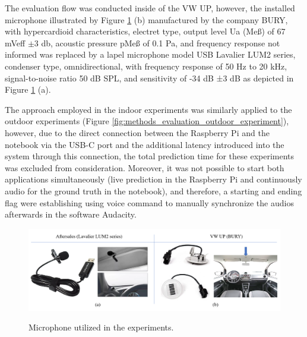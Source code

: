 The evaluation flow was conducted inside of the VW UP, however, the installed microphone illustrated by Figure \ref{fig:methods_evaluation_microphone_aftersales_and_VW_UP} (b) manufactured by the company BURY, with hypercardioid characteristics, electret type, output level Ua (Meß) of 67 mVeff $\pm$3 \gls{db}, acoustic pressure pMeß of 0.1 Pa, and frequency response not informed \cite{BURY2024} was replaced by a lapel microphone model USB Lavalier LUM2 series, condenser type, omnidirectional, with frequency response of 50 Hz to 20 kHz, signal-to-noise ratio 50 dB SPL, and sensitivity of -34 dB ±3 dB \cite{CKMOVA2021} as depicted in Figure \ref{fig:methods_evaluation_microphone_aftersales_and_VW_UP} (a).

The approach employed in the indoor experiments was similarly applied to the outdoor experiments (Figure \ref{fig:methods_evaluation_outdoor_experiment}), however, due to the direct connection between the Raspberry Pi and the notebook via the USB-C port and the additional latency introduced into the system through this connection, the total prediction time for these experiments was excluded from consideration. Moreover, it was not possible to start both applications simultaneously (live prediction in the Raspberry Pi and continuously audio for the ground truth in the notebook), and therefore, a starting and ending flag were establishing using voice command to manually synchronize the audios afterwards in the software Audacity.

\begin{figure}[htbp]
    \raggedright
        \caption{Microphone utilized in the experiments.}
        \includegraphics[width=1\textwidth]{resources/images/050-methods/Methods_evaluation_microphone_aftersales_VW_UP.png}
        \label{fig:methods_evaluation_microphone_aftersales_and_VW_UP}
\end{figure}

